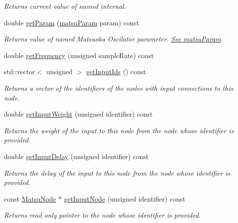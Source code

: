 \begin{DoxyCompactItemize}
\begin{DoxyCompactList}\small\item\em Returns current value of named internal. \end{DoxyCompactList}\item 
double \hyperlink{classMatsuNode_a3d84c35ec3d5c1a42bf56acd506fc044}{get\+Param} (\hyperlink{classMatsuNode_aed801e1d0363292efc99bb02f1911386}{matsu\+Param} param) const 
\begin{DoxyCompactList}\small\item\em Returns value of named Matsuoka Oscilator parameter. \hyperlink{classMatsuNode_aed801e1d0363292efc99bb02f1911386}{See matsu\+Param}. \end{DoxyCompactList}\item 
double \hyperlink{classMatsuNode_a2b151c750feec2f87b1534e61dab0e84}{get\+Frequency} (unsigned sample\+Rate) const 
\item 
std\+::vector$<$ unsigned $>$ \hyperlink{classMatsuNode_a403279206a97376f769fcbe18a92bb67}{get\+Input\+Ids} () const 
\begin{DoxyCompactList}\small\item\em Returns a vector of the identifiers of the nodes with input connections to this node. \end{DoxyCompactList}\item 
double \hyperlink{classMatsuNode_a30384a48094914de7f928031441ed138}{get\+Input\+Weight} (unsigned identifier) const 
\begin{DoxyCompactList}\small\item\em Returns the weight of the input to this node from the node whose identifier is provided. \end{DoxyCompactList}\item 
double \hyperlink{classMatsuNode_a5d63ba215d4cf8583de3f2a89ef7fc78}{get\+Input\+Delay} (unsigned identifier) const 
\begin{DoxyCompactList}\small\item\em Returns the delay of the input to this node from the node whose identifier is provided. \end{DoxyCompactList}\item 
const \hyperlink{classMatsuNode}{Matsu\+Node} $\ast$ \hyperlink{classMatsuNode_a5cec4474ffd3c95b781de205922f76ff}{get\+Input\+Node} (unsigned identifier) const 
\begin{DoxyCompactList}\small\item\em Returns read only pointer to the node whose identifier is provided. \end{DoxyCompactList}\item 

\end{DoxyCompactItemize}
